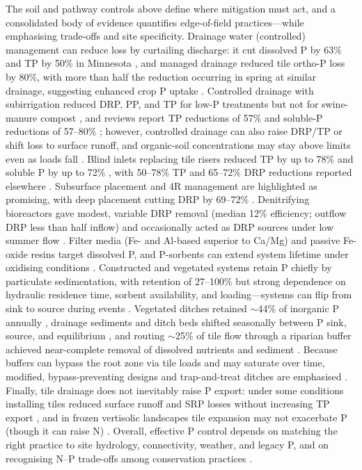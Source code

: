 \documentclass[11pt]{article}
\begin{document}
The soil and pathway controls above define where mitigation must act, and a consolidated body of
evidence quantifies edge-of-field practices---while emphasising trade-offs and site specificity.
Drainage water (controlled) management can reduce loss by curtailing discharge: it cut dissolved P
by 63\% and TP by 50\% in Minnesota \parencite{Kröger2013}, and managed drainage reduced tile
ortho-P loss by 80\%, with more than half the reduction occurring in spring at similar drainage,
suggesting enhanced crop P uptake \parencite{Nash2015c}. Controlled drainage with subirrigation
reduced DRP, PP, and TP for low-P treatments but not for swine-manure compost
\parencite{Zhang2015}, and reviews report TP reductions of 57\% and soluble-P reductions of
57--80\% \parencite{Elsayed2023}; however, controlled drainage can also raise DRP/TP or shift loss
to surface runoff, and organic-soil concentrations may stay above limits even as loads fall
\parencite{Grewal2025,Sadhukhan2019b,Grenon2021}. Blind inlets replacing tile risers reduced TP by
up to 78\% and soluble P by up to 72\% \parencite{Kröger2013}, with 50--78\% TP and 65--72\% DRP
reductions reported elsewhere \parencite{Singh2020c}. Subsurface placement and 4R management are
highlighted as promising, with deep placement cutting DRP by 69--72\%
\parencite{Wilson2019,Sharpley2019,Singh2020c}. Denitrifying bioreactors gave modest, variable DRP
removal (median 12\% efficiency; outflow DRP less than half inflow) and occasionally acted as DRP
sources under low summer flow \parencite{Bailon2025}. Filter media (Fe- and Al-based superior to
Ca/Mg) and passive Fe-oxide resins target dissolved P, and P-sorbents can extend system lifetime
under oxidising conditions \parencite{Mendes2020,Li2020b}. Constructed and vegetated systems retain
P chiefly by particulate sedimentation, with retention of 27--100\% but strong dependence on
hydraulic residence time, sorbent availability, and loading---systems can flip from sink to source
during events \parencite{Mendes2020,Kröger2013,Singh2020c}. Vegetated ditches retained
$\sim$44\% of inorganic P annually \parencite{Kröger2013}, drainage sediments and ditch beds shifted
seasonally between P sink, source, and equilibrium \parencite{Ahiablame2010,Nguyen2002}, and routing
$\sim$25\% of tile flow through a riparian buffer achieved near-complete removal of dissolved
nutrients and sediment \parencite{Jacquemin2020}. Because buffers can bypass the root zone via tile
loads and may saturate over time, modified, bypass-preventing designs and trap-and-treat ditches
are emphasised \parencite{Mendes2020,Millar2025,Baulch2019}. Finally, tile drainage does not
inevitably raise P export: under some conditions installing tiles reduced surface runoff and SRP
losses without increasing TP export \parencite{Klaiber2020}, and in frozen vertisolic landscapes
tile expansion may not exacerbate P (though it can raise N) \parencite{Kokulan2021}. Overall,
effective P control depends on matching the right practice to site hydrology, connectivity, weather,
and legacy P, and on recognising N--P trade-offs among conservation practices
\parencite{King2015,Sharpley2019,Ni2020,Baulch2019,Wilson2019}.

\printbibliography
\end{document}
